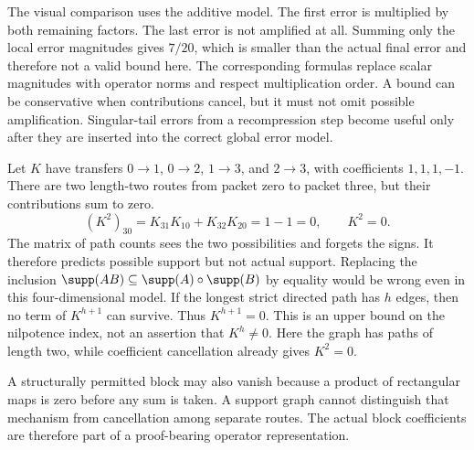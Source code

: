 The visual comparison uses the additive model. The first error is multiplied by both remaining factors. The last error is not amplified at all. Summing only the local error magnitudes gives $7/20$, which is smaller than the actual final error and therefore not a valid bound here.
The corresponding formulas replace scalar magnitudes with operator norms and respect multiplication order. A bound can be conservative when contributions cancel, but it must not omit possible amplification. Singular-tail errors from a recompression step become useful only after they are inserted into the correct global error model.

Let $K$ have transfers $0\to1$, $0\to2$, $1\to3$, and $2\to3$, with coefficients $1,1,1,-1$. There are two length-two routes from packet zero to packet three, but their contributions sum to zero.
\[
(K^2)_{30}=K_{31}K_{10}+K_{32}K_{20}=1-1=0,
\qquad K^2=0.
\]
The matrix of path counts sees the two possibilities and forgets the signs. It therefore predicts possible support but not actual support. Replacing the inclusion $\supp(AB)\subseteq\supp(A)\circ\supp(B)$ by equality would be wrong even in this four-dimensional model.
If the longest strict directed path has $h$ edges, then no term of $K^{h+1}$ can survive. Thus $K^{h+1}=0$. This is an upper bound on the nilpotence index, not an assertion that $K^h\ne0$. Here the graph has paths of length two, while coefficient cancellation already gives $K^2=0$.

A structurally permitted block may also vanish because a product of rectangular maps is zero before any sum is taken. A support graph cannot distinguish that mechanism from cancellation among separate routes. The actual block coefficients are therefore part of a proof-bearing operator representation.

